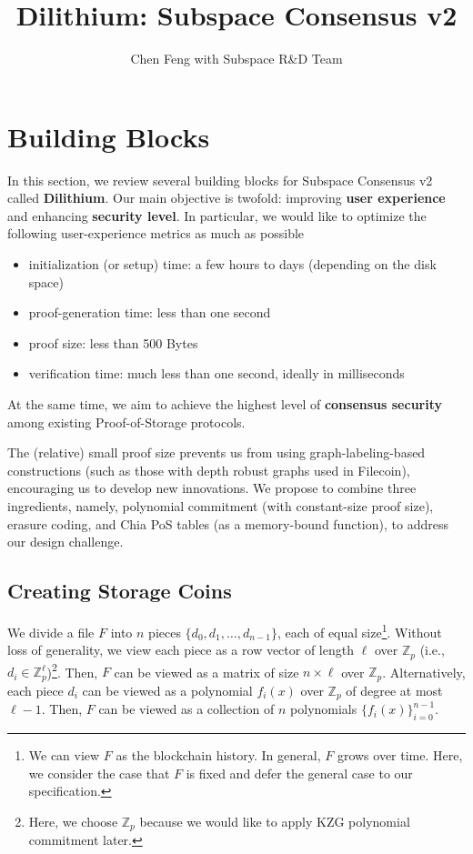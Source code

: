 \documentclass[12pt,draftcls,onecolumn]{IEEEtran}
\title{Dilithium: Subspace Consensus v2}
\author{Chen Feng with Subspace R\&D Team}
\newcommand{\Fp}{\mathbb{Z}_p}
\begin{document}
\maketitle


\section{Building Blocks}

In this section, we review several building blocks for Subspace Consensus v2 called {\bf Dilithium}. 
Our main objective is twofold: improving {\bf user experience} and enhancing {\bf security level}.
In particular, we would like to optimize the following user-experience metrics as much as possible
\begin{itemize}
    \item initialization (or setup) time: a few hours to days (depending on the disk space)
    \item proof-generation time: less than one second
    \item proof size: less than 500 Bytes
    \item verification time: much less than one second, ideally in milliseconds
\end{itemize}
At the same time, we aim to achieve the highest level of {\bf consensus security} among existing Proof-of-Storage protocols. 

The (relative) small proof size prevents us from using graph-labeling-based constructions (such as those with depth robust graphs used in Filecoin), encouraging us to develop new innovations. We propose to combine three ingredients, namely, polynomial commitment (with constant-size proof size), erasure coding, and Chia PoS tables (as a memory-bound function), to address our design challenge.  

\subsection{Creating Storage Coins}

We divide a file $F$ into $n$ pieces $\{ d_0, d_1, \ldots, d_{n-1}\}$, each of equal size\footnote{We can view $F$ as the blockchain history. In general, $F$ grows over time. Here, we consider the case that $F$ is fixed and defer the general case to our specification.}. 
Without loss of generality, we view each piece as a row vector of length $\ell$ over $\Fp$  (i.e., $d_i \in \Fp^\ell$)\footnote{Here, we choose $\Fp$ because we would like to apply KZG polynomial commitment later.}.
Then, $F$ can be viewed as a matrix of size $n \times \ell$ over $\Fp$.
Alternatively, each piece $d_i$ can be viewed as a polynomial $f_i(x)$ over $\Fp$ of degree at most $\ell - 1$. 
Then, $F$ can be viewed as a collection of $n$ polynomials $\{ f_i(x) \}_{i = 0}^{n-1}$. 
\end{document}
